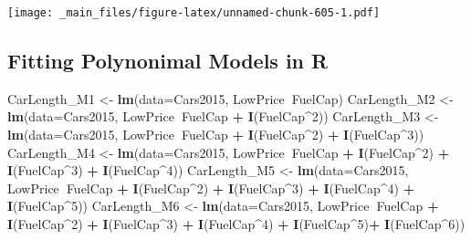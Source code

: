 \documentclass[]{book}
\newenvironment{Shaded}{\begin{snugshade}}{\end{snugshade}}
\newcommand{\KeywordTok}[1]{\textcolor[rgb]{0.13,0.29,0.53}{\textbf{#1}}}
\newcommand{\DataTypeTok}[1]{\textcolor[rgb]{0.13,0.29,0.53}{#1}}
\newcommand{\DecValTok}[1]{\textcolor[rgb]{0.00,0.00,0.81}{#1}}
\newcommand{\StringTok}[1]{\textcolor[rgb]{0.31,0.60,0.02}{#1}}
\newcommand{\OperatorTok}[1]{\textcolor[rgb]{0.81,0.36,0.00}{\textbf{#1}}}
\newcommand{\NormalTok}[1]{#1}
\begin{document}
\texttt{[image: \_main\_files/figure-latex/unnamed-chunk-605-1.pdf]}

\subsection{Fitting Polynonimal Models in
R}\label{fitting-polynonimal-models-in-r}

\begin{Shaded}
\begin{Highlighting}[]
\NormalTok{CarLength_M1 <-}\StringTok{ }\KeywordTok{lm}\NormalTok{(}\DataTypeTok{data=}\NormalTok{Cars2015, LowPrice}\OperatorTok{~}\NormalTok{FuelCap)}
\NormalTok{CarLength_M2 <-}\StringTok{ }\KeywordTok{lm}\NormalTok{(}\DataTypeTok{data=}\NormalTok{Cars2015, LowPrice}\OperatorTok{~}\NormalTok{FuelCap }\OperatorTok{+}\StringTok{ }\KeywordTok{I}\NormalTok{(FuelCap}\OperatorTok{^}\DecValTok{2}\NormalTok{))}
\NormalTok{CarLength_M3 <-}\StringTok{ }\KeywordTok{lm}\NormalTok{(}\DataTypeTok{data=}\NormalTok{Cars2015, LowPrice}\OperatorTok{~}\NormalTok{FuelCap }\OperatorTok{+}\StringTok{ }\KeywordTok{I}\NormalTok{(FuelCap}\OperatorTok{^}\DecValTok{2}\NormalTok{) }\OperatorTok{+}\StringTok{ }\KeywordTok{I}\NormalTok{(FuelCap}\OperatorTok{^}\DecValTok{3}\NormalTok{))}
\NormalTok{CarLength_M4 <-}\StringTok{ }\KeywordTok{lm}\NormalTok{(}\DataTypeTok{data=}\NormalTok{Cars2015, LowPrice}\OperatorTok{~}\NormalTok{FuelCap }\OperatorTok{+}\StringTok{ }\KeywordTok{I}\NormalTok{(FuelCap}\OperatorTok{^}\DecValTok{2}\NormalTok{) }\OperatorTok{+}\StringTok{ }\KeywordTok{I}\NormalTok{(FuelCap}\OperatorTok{^}\DecValTok{3}\NormalTok{) }\OperatorTok{+}\StringTok{ }\KeywordTok{I}\NormalTok{(FuelCap}\OperatorTok{^}\DecValTok{4}\NormalTok{))}
\NormalTok{CarLength_M5 <-}\StringTok{ }\KeywordTok{lm}\NormalTok{(}\DataTypeTok{data=}\NormalTok{Cars2015, LowPrice}\OperatorTok{~}\NormalTok{FuelCap }\OperatorTok{+}\StringTok{ }\KeywordTok{I}\NormalTok{(FuelCap}\OperatorTok{^}\DecValTok{2}\NormalTok{) }\OperatorTok{+}\StringTok{ }\KeywordTok{I}\NormalTok{(FuelCap}\OperatorTok{^}\DecValTok{3}\NormalTok{) }\OperatorTok{+}\StringTok{ }\KeywordTok{I}\NormalTok{(FuelCap}\OperatorTok{^}\DecValTok{4}\NormalTok{) }\OperatorTok{+}\StringTok{ }
\StringTok{                     }\KeywordTok{I}\NormalTok{(FuelCap}\OperatorTok{^}\DecValTok{5}\NormalTok{))}
\NormalTok{CarLength_M6 <-}\StringTok{ }\KeywordTok{lm}\NormalTok{(}\DataTypeTok{data=}\NormalTok{Cars2015, LowPrice}\OperatorTok{~}\NormalTok{FuelCap }\OperatorTok{+}\StringTok{ }\KeywordTok{I}\NormalTok{(FuelCap}\OperatorTok{^}\DecValTok{2}\NormalTok{) }\OperatorTok{+}\StringTok{ }\KeywordTok{I}\NormalTok{(FuelCap}\OperatorTok{^}\DecValTok{3}\NormalTok{) }\OperatorTok{+}\StringTok{ }\KeywordTok{I}\NormalTok{(FuelCap}\OperatorTok{^}\DecValTok{4}\NormalTok{) }\OperatorTok{+}\StringTok{ }
\StringTok{                     }\KeywordTok{I}\NormalTok{(FuelCap}\OperatorTok{^}\DecValTok{5}\NormalTok{)}\OperatorTok{+}\StringTok{ }\KeywordTok{I}\NormalTok{(FuelCap}\OperatorTok{^}\DecValTok{6}\NormalTok{))}
\end{Highlighting}
\end{Shaded}
\end{document}
